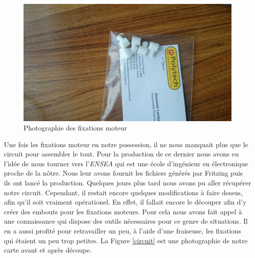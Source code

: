 \documentclass[a4paper,10pt]{report}
\begin{document}
      \begin{figure}[htbp]%
	\centering
	\includegraphics[scale = 0.1]{img/fixations.jpg}
	\caption{Photographie des fixations moteur}
	\label{fixation}
      \end{figure}

      Une fois les fixations moteur en notre possession, il ne nous manquait 
plus que le circuit pour assembler le tout. Pour la production de ce dernier 
nous avons eu l'idée de nous tourner vers l'\textit{ENSEA} qui est une école 
d'ingénieur en électronique proche de la nôtre. Nous leur avons fournit les 
fichiers générés par Fritzing puis ils ont lancé la production. Quelques jours 
plus tard nous avons pu aller récupérer notre circuit. Cependant, il restait 
encore quelques modifications à faire dessus, afin qu'il soit vraiment 
opérationel. En effet, il fallait encore le découper afin d'y créer des embouts 
pour les fixations moteurs. Pour cela nous avons fait appel à une connaissance 
qui dispose des outils nécessaires pour ce genre de situations. Il en a aussi 
profité pour retravailler un peu, à l'aide d'une fraiseuse, les fixations qui 
étaient un peu trop petites. La Figure \ref{circuit} est une photographie de 
notre carte avant et après découpe.
\end{document}
